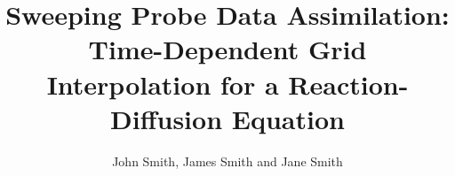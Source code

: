 \documentclass[final]{beamer}
\title{Sweeping Probe Data Assimilation:\\ Time-Dependent Grid Interpolation for a Reaction-Diffusion Equation} %
\author{John Smith, James Smith and Jane Smith} %
\institute{Department and University Name} %
\newlength{\sepwid}
\newlength{\onecolwid}
\begin{document}

\setlength{\belowcaptionskip}{2ex} %
\setlength\belowdisplayshortskip{2ex} %

\begin{frame}[t] %

\begin{columns}[t] %

\begin{column}{\sepwid}\end{column} %

\begin{column}{\onecolwid} %


%


\end{column}
\end{columns}
\end{frame}
\end{document}
